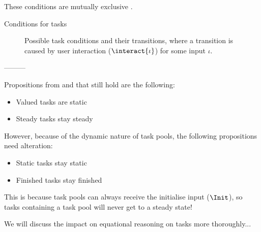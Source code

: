 These conditions are mutually exclusive .

\begin{table}
  
  \caption{Conditions for tasks}
  \label{tab:task-conditions}
\end{table}

\begin{figure}
  
  \caption{Possible task conditions and their transitions, where a transition is caused by user interaction ($\interact{\iota}$) for some input $\iota$.}
  \label{fig:task-conditions}
\end{figure}


---------






Propositions from \cite{Steenvoorden22} and \cite{Klijnsma2020} that still hold are the following:

\begin{itemize}
  \item Valued tasks are static
  \item Steady tasks stay steady
\end{itemize}

However, because of the dynamic nature of task pools, the following propositions need alteration:

\begin{itemize}
  \item Static tasks stay static
  \item Finished tasks stay finished
\end{itemize}

This is because task pools can always receive the initialise input ($\Init$),
so tasks containing a task pool will never get to a steady state!

We will discuss the impact on equational reasoning on tasks more thoroughly...